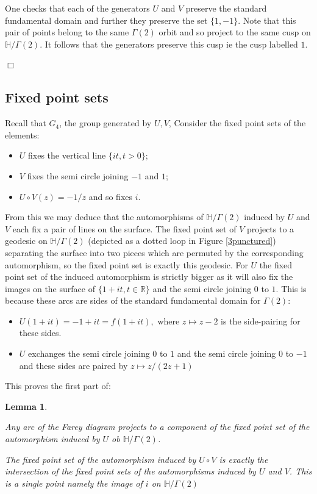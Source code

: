 \documentclass[12pt,a4paper]{amsart}
\newtheorem{lem}[thm]{Lemma}
\def\HH{\mathbb{H}}
\def\KK{G_4}
\def\xx{\HH/g2}
\def\RR{\mathbb{R}}
\def\g2{\Gamma(2)}
\def\xx{\HH/\g2}
\begin{document}
One checks that each of the generators $U$ and $V$ preserve the
standard fundamental domain and further they preserve the set
$\{1,-1\}$. Note that this pair of points belong to the same $\g2$
orbit and so project to the same cusp on $\xx$. It follows that the
generators preserve this cusp ie the cusp labelled $1$.

\hfill $\Box$


\subsection{Fixed point sets }

Recall that  $\KK$,  the group generated by $U,V$,
Consider the fixed point sets of the elements:
\begin{itemize}
\item $U$ fixes the  vertical line $\{ it, t >0 \} $;
\item $V$ fixes the  semi circle  joining $-1$ and $1$;
\item $U\circ V(z) = -1/z$  and so fixes $i$.
\end{itemize}
From this we may deduce that the automorphisms of $\xx$ induced by $U$ and $V$ 
each fix a pair of lines on the surface. 
The fixed point set of  $V$ projects 
to a geodesic on $\xx$ (depicted as a dotted loop in Figure \ref{3punctured})
separating the surface
 into  two pieces which are permuted by 
the corresponding automorphism,
so the fixed point set is exactly this geodesic.
For $U$ the fixed point set of the induced automorphism  is strictly bigger 
as it will also fix  the images on the surface of 
$\{1+  it, t \in \RR \} $ 
and the semi circle joining $0$ to $1$.
This is because
these arcs are sides of the standard fundamental domain for $\g2$:
\begin{itemize}
	\item
$U(1+  it) = - 1+  it = f(1+  it),$
where $ z \mapsto z - 2$ is the side-pairing for these sides.
	\item
$U$ exchanges 
the semi circle joining $0$ to $1$
and the semi circle joining $0$ to $-1$
and these sides are paired by $z \mapsto z/(2z +1)$ 
\end{itemize}

This proves the first part of:

\begin{lem} \label{the fixed point}
	
	Any arc of the Farey diagram projects to a component of the
	fixed point set of the automorphism induced by $U$ ob $\xx$.

	The fixed point set of the automorphism induced by $U\circ
	V$  is exactly the intersection of the fixed point sets of
	the automorphisms induced by $U$ and $V$. This is  a single
	point namely the image of $i$ on $\xx$

\end{lem}
\end{document}
